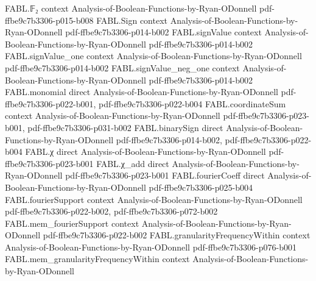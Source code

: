 \begin{theorem}
\label{FABL.two_mul_blrAcceptanceProbability_sub_one_eq_sum_cube_fourierCoeff}
\leanok
{}
\proofstep
  {FABL.𝔽₂}
  {context}
  {Analysis-of-Boolean-Functions-by-Ryan-ODonnell}
  {pdf-ffbe9c7b3306-p015-b008}
\proofstep
  {FABL.Sign}
  {context}
  {Analysis-of-Boolean-Functions-by-Ryan-ODonnell}
  {pdf-ffbe9c7b3306-p014-b002}
\proofstep
  {FABL.signValue}
  {context}
  {Analysis-of-Boolean-Functions-by-Ryan-ODonnell}
  {pdf-ffbe9c7b3306-p014-b002}
\proofstep
  {FABL.signValue_one}
  {context}
  {Analysis-of-Boolean-Functions-by-Ryan-ODonnell}
  {pdf-ffbe9c7b3306-p014-b002}
\proofstep
  {FABL.signValue_neg_one}
  {context}
  {Analysis-of-Boolean-Functions-by-Ryan-ODonnell}
  {pdf-ffbe9c7b3306-p014-b002}
\proofstep
  {FABL.monomial}
  {direct}
  {Analysis-of-Boolean-Functions-by-Ryan-ODonnell}
  {pdf-ffbe9c7b3306-p022-b001,
    pdf-ffbe9c7b3306-p022-b004}
\proofstep
  {FABL.coordinateSum}
  {context}
  {Analysis-of-Boolean-Functions-by-Ryan-ODonnell}
  {pdf-ffbe9c7b3306-p023-b001,
    pdf-ffbe9c7b3306-p031-b002}
\proofstep
  {FABL.binarySign}
  {direct}
  {Analysis-of-Boolean-Functions-by-Ryan-ODonnell}
  {pdf-ffbe9c7b3306-p014-b002,
    pdf-ffbe9c7b3306-p022-b004}
\proofstep
  {FABL.χ}
  {direct}
  {Analysis-of-Boolean-Functions-by-Ryan-ODonnell}
  {pdf-ffbe9c7b3306-p023-b001}
\proofstep
  {FABL.χ_add}
  {direct}
  {Analysis-of-Boolean-Functions-by-Ryan-ODonnell}
  {pdf-ffbe9c7b3306-p023-b001}
\proofstep
  {FABL.fourierCoeff}
  {direct}
  {Analysis-of-Boolean-Functions-by-Ryan-ODonnell}
  {pdf-ffbe9c7b3306-p025-b004}
\proofstep
  {FABL.fourierSupport}
  {context}
  {Analysis-of-Boolean-Functions-by-Ryan-ODonnell}
  {pdf-ffbe9c7b3306-p022-b002,
    pdf-ffbe9c7b3306-p072-b002}
\proofstep
  {FABL.mem_fourierSupport}
  {context}
  {Analysis-of-Boolean-Functions-by-Ryan-ODonnell}
  {pdf-ffbe9c7b3306-p022-b002}
\proofstep
  {FABL.granularityFrequencyWithin}
  {context}
  {Analysis-of-Boolean-Functions-by-Ryan-ODonnell}
  {pdf-ffbe9c7b3306-p076-b001}
\proofstep
  {FABL.mem_granularityFrequencyWithin}
  {context}
  {Analysis-of-Boolean-Functions-by-Ryan-ODonnell}

\end{theorem}
